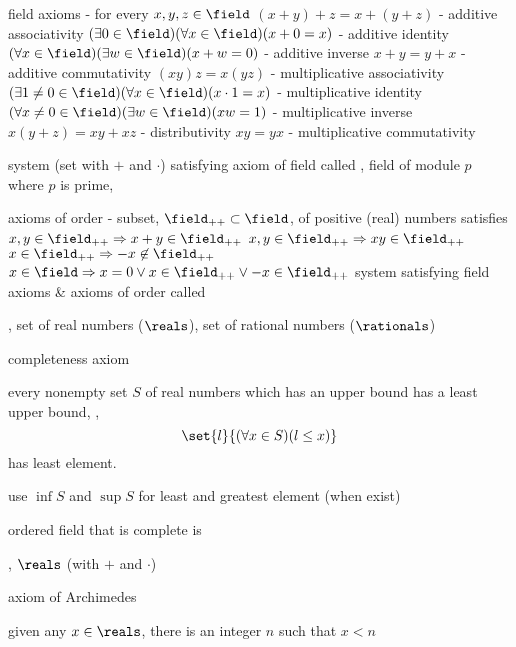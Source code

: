 \documentclass[17pt,landscape]{foils}
\begin{document}
{\bit
	\item field axioms - for every $x,y,z\in\field$
	\bit
		\vitem $(x+y)+z= x+(y+z)$ - additive associativity
		\vitem $(\exists 0\in\field)(\forall x\in\field)(x+0=x)$ - additive identity
		\vitem $(\forall x\in\field)(\exists w\in\field)(x+w=0)$ - additive inverse
		\vitem $x+y= y+x$ - additive commutativity
		\vvitem $(xy)z= x(yz)$ - multiplicative associativity
		\vitem $(\exists 1\neq0\in\field)(\forall x\in\field)(x\cdot 1=x)$ - multiplicative identity
		\vitem $(\forall x\neq0\in\field)(\exists w\in\field)(xw=1)$ - multiplicative inverse
		\vvitem $x(y+z) = xy + xz$ - distributivity
		\vitem $xy= yx$ - multiplicative commutativity
	\eit

	\vvitem system (set with $+$ and $\cdot$) satisfying axiom of field called 
	\bit
		\vitem \eg, field of module $p$ where $p$ is prime, \
	\eit
\eit



\bit
	\item axioms of order - subset, $\field_{++}\subset \field$, of positive (real) numbers satisfies
	\bit
		\vitem $x,y\in \field_{++} \Rightarrow x+y\in \field_{++}$
		\vitem $x,y\in \field_{++} \Rightarrow xy\in \field_{++}$
		\vitem $x\in \field_{++} \Rightarrow -x\not\in \field_{++}$
		\vitem $x\in \field \Rightarrow x=0\lor x\in \field_{++} \lor -x \in \field_{++}$
	\eit
	\vvitem system satisfying field axioms \& axioms of order called 
	\bit
		\item \eg, set of real numbers ($\reals$), set of rational numbers ($\rationals$)
	\eit
\eit



\bit
	\item completeness axiom
	\bit
		\item every nonempty set $S$ of real numbers which has an upper bound has a least upper bound,
		\ie,
		\[
			\set{l}{(\forall x\in S)(l\leq x)}
		\]
		has least element.
		\item use $\inf S$ and $\sup S$ for least and greatest element (when exist)
	\eit

	\vitem ordered field that is complete is %
		\index{complete!ordered field}
	\bit
		\item \eg, $\reals$ (with $+$ and $\cdot$)
	\eit

	\vvitem [$\Rightarrow$] axiom of Archimedes
	\bit
		\item given any $x\in\reals$, there is an integer $n$ such that $x<n$
	\eit

}
\end{document}
